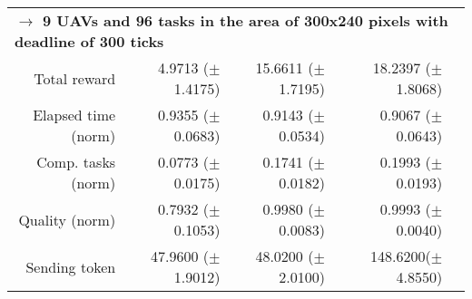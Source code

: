 \begin{table}
\begin{tabular}{rrrrr}
        \multicolumn{5}{l}{\textbf{$\longrightarrow$ 9 UAVs and 96 tasks in the area of 300x240 pixels with deadline of 300 ticks}} \\
	Total reward           & 4.9713   ($\pm$1.4175)  & 15.6611  ($\pm$1.7195) & 18.2397 ($\pm$1.8068)   \\
	Elapsed time (norm)    & 0.9355   ($\pm$0.0683)  &  0.9143  ($\pm$0.0534) & 0.9067  ($\pm$0.0643)    \\ 
	Comp. tasks (norm)     & 0.0773   ($\pm$0.0175)  &  0.1741  ($\pm$0.0182) & 0.1993  ($\pm$0.0193)    \\ 
	Quality (norm)         & 0.7932   ($\pm$0.1053)  &  0.9980  ($\pm$0.0083) & 0.9993  ($\pm$0.0040)   \\ 
	Sending token          & 47.9600  ($\pm$1.9012)  &  48.0200 ($\pm$2.0100) & 148.6200($\pm$4.8550)   \\ [1ex]

		\hline
	\end{tabular}
\end{table} 




